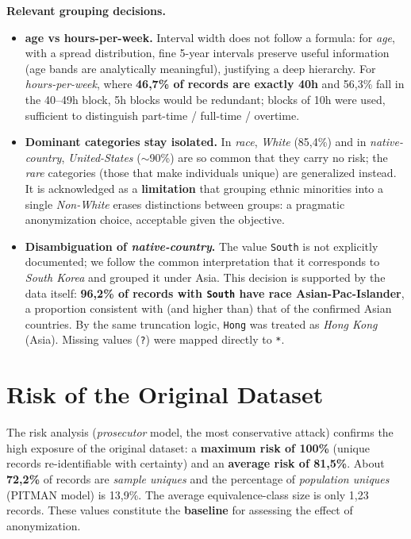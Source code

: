 \documentclass[10pt,a4paper]{article}
\begin{document}
\textbf{Relevant grouping decisions.}
\begin{itemize}
\item \textbf{age vs hours-per-week.} Interval width does not follow a formula: for \textit{age}, with a spread
distribution, fine 5-year intervals preserve useful information (age bands are analytically meaningful),
justifying a deep hierarchy. For \textit{hours-per-week}, where \textbf{46{,}7\% of records are exactly 40h} and
56{,}3\% fall in the 40--49h block, 5h blocks would be redundant; blocks of 10h were used, sufficient to
distinguish part-time / full-time / overtime.
\item \textbf{Dominant categories stay isolated.} In \textit{race}, \textit{White} (85{,}4\%) and in
\textit{native-country}, \textit{United-States} ($\sim$90\%) are so common that they carry no risk; the
\emph{rare} categories (those that make individuals unique) are generalized instead. It is acknowledged as
a \textbf{limitation} that grouping ethnic minorities into a single \textit{Non-White} erases distinctions
between groups: a pragmatic anonymization choice, acceptable given the objective.
\item \textbf{Disambiguation of \textit{native-country}.} The value \texttt{South} is not explicitly documented;
we follow the common interpretation that it corresponds to \emph{South Korea} and grouped it under Asia. This
decision is supported by the data itself: \textbf{96{,}2\% of records with \texttt{South} have race
Asian-Pac-Islander}, a proportion consistent with (and higher than) that of the confirmed Asian countries. By
the same truncation logic, \texttt{Hong} was treated as \emph{Hong Kong} (Asia). Missing values (\texttt{?})
were mapped directly to \texttt{*}.
\end{itemize}

\section{Risk of the Original Dataset}
The risk analysis (\textit{prosecutor} model, the most conservative attack) confirms the high exposure of the
original dataset: a \textbf{maximum risk of 100\%} (unique records re-identifiable with certainty) and an
\textbf{average risk of 81{,}5\%}. About \textbf{72{,}2\%} of records are \textit{sample uniques} and the
percentage of \textit{population uniques} (PITMAN model) is 13{,}9\%. The average equivalence-class size is only
1{,}23 records. These values constitute the \textbf{baseline} for assessing the effect of anonymization.
\end{document}
